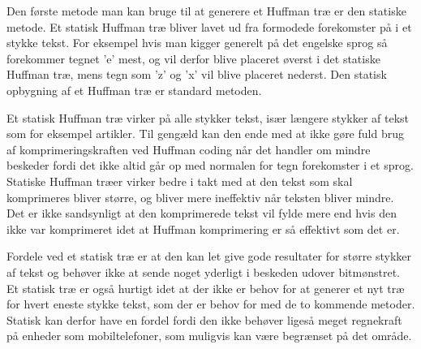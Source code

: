 Den første metode man kan bruge til at generere et Huffman træ er den statiske metode. Et statisk Huffman træ bliver lavet ud fra formodede forekomster på i et stykke tekst. For eksempel hvis man kigger generelt på det engelske sprog så forekommer tegnet ’e’ mest, og vil derfor blive placeret øverst i det statiske Huffman træ, mens tegn som ’z’ og ’x’ vil blive placeret nederst. Den statisk opbygning af et Huffman træ er standard metoden\cite{Hufftree_2}.

Et statisk Huffman træ virker på alle stykker tekst, især længere stykker af tekst som for eksempel artikler. Til gengæld kan den ende med at ikke gøre fuld brug af komprimeringskraften ved Huffman coding når det handler om mindre beskeder fordi det ikke altid går op med normalen for tegn forekomster i et sprog. Statiske Huffman træer virker bedre i takt med at den tekst som skal komprimeres bliver større, og bliver mere ineffektiv når teksten bliver mindre. Det er ikke sandsynligt at den komprimerede tekst vil fylde mere end hvis den ikke var komprimeret idet at Huffman komprimering er så effektivt som det er. \cite{Hufftree_3}

Fordele ved et statisk træ er at den kan let give gode resultater for større stykker af tekst og behøver ikke at sende noget yderligt i beskeden udover bitmønstret. Et statisk træ er også hurtigt idet at der ikke er behov for at generer et nyt træ for hvert eneste stykke tekst, som der er behov for med de to kommende metoder. Statisk kan derfor have en fordel fordi den ikke behøver ligeså meget regnekraft på enheder som mobiltelefoner, som muligvis kan være begrænset på det område.
